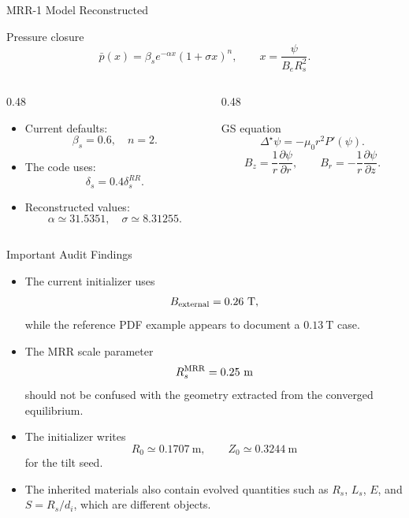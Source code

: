 \documentclass[10pt,aspectratio=169]{beamer}
\begin{document}
\begin{frame}{MRR-1 Model Reconstructed}
    \begin{block}{Pressure closure}
        \[
        \bar p(x)
        =
        \beta_s e^{-\alpha x}
        (1+\sigma x)^n,
        \qquad
        x=\frac{\psi}{B_e R_s^2}.
        \]
    \end{block}

    \begin{columns}[T,onlytextwidth]
        \begin{column}{0.48\textwidth}
            \begin{itemize}
                \item Current defaults:
                \[
                \beta_s=0.6,\quad n=2.
                \]
                \item The code uses:
                \[
                \delta_s=0.4\delta_s^{RR}.
                \]
                \item Reconstructed values:
                \[
                \alpha\simeq31.5351,
                \quad
                \sigma\simeq8.31255.
                \]
            \end{itemize}
        \end{column}

        \begin{column}{0.48\textwidth}
            \begin{block}{GS equation}
                \[
                \Delta^\star\psi
                =
                -\mu_0 r^2 P'(\psi).
                \]
                \[
                B_z=\frac{1}{r}\frac{\partial\psi}{\partial r},
                \qquad
                B_r=-\frac{1}{r}\frac{\partial\psi}{\partial z}.
                \]
            \end{block}
        \end{column}
    \end{columns}
\end{frame}

\begin{frame}{Important Audit Findings}
    \begin{itemize}
        \item The current initializer uses
        \[
        B_{\rm external}=0.26~\mathrm{T},
        \]
        while the reference PDF example appears to document a
        \(0.13~\mathrm{T}\) case.
        \item The MRR scale parameter
        \[
        R_s^{\rm MRR}=0.25~\mathrm{m}
        \]
        should not be confused with the geometry extracted from the converged
        equilibrium.
        \item The initializer writes
        \[
        R_0\simeq0.1707~\mathrm{m},
        \qquad
        Z_0\simeq0.3244~\mathrm{m}
        \]
        for the tilt seed.
        \item The inherited materials also contain evolved quantities such as
        \(R_s\), \(L_s\), \(E\), and \(S=R_s/d_i\), which are different objects.
    \end{itemize}
\end{frame}
\end{document}

